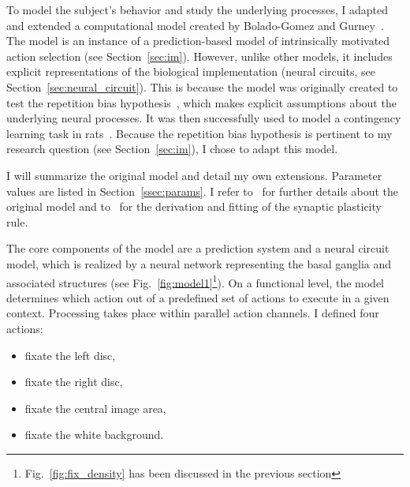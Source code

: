 \documentclass[a4paper]{scrreprt}
\begin{document}
To model the subject's behavior and study the underlying processes, I adapted and extended a computational model created by Bolado-Gomez and Gurney~\cite{bg13}. 
The model is an instance of a prediction-based model of intrinsically motivated action selection (see Section~\ref{sec:im}). However, unlike other models, it includes explicit representations of the biological implementation (neural circuits, see Section~\ref{sec:neural_circuit}). This is because the model was originally created to test the repetition bias hypothesis~\cite{redgrave06,gurney12,redgrave12}, which makes explicit assumptions about the underlying neural processes. It was then successfully used to model a contingency learning task in rats~\cite{gancarz11}. Because the repetition bias hypothesis is pertinent to my research question (see Section~\ref{sec:im}), I chose to adapt this model.

I will summarize the original model and detail my own extensions. Parameter values are listed in Section~\ref{ssec:params}. I refer to~\cite{bg13, bg14} for further details about the original model and to~\cite{gurney15} for the derivation and fitting of the synaptic plasticity rule.

The core components of the model are a prediction system and a neural circuit model, which is realized by a neural network representing the basal ganglia and associated structures (see Fig.~\ref{fig:model1}\footnote{Fig.~\ref{fig:fix_density} has been discussed in the previous section}).
On a functional level, the model determines which action out of a predefined set of actions to execute in a given context. Processing takes place within parallel action channels. I defined four actions:
\begin{itemize}
\item fixate the left disc,
\item fixate the right disc,
\item fixate the central image area,
\item fixate the white background.
\end{itemize}
\end{document}
